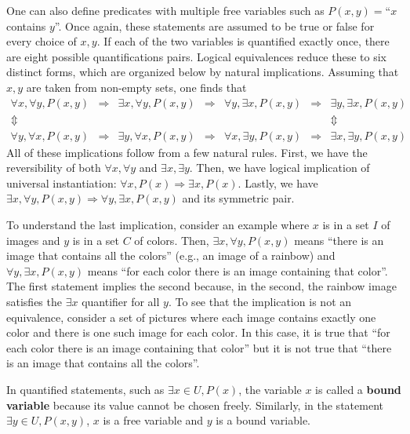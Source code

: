 One can also define predicates with multiple free variables such as $P(x,y)=$``$x$ contains $y$''.
Once again, these statements are assumed to be true or false for every choice of $x,y$.
If each of the two variables is quantified exactly once, there are eight possible quantifications pairs.
Logical equivalences reduce these to six distinct forms, which are organized below by natural implications.
Assuming that $x,y$ are taken from non-empty sets, one finds that
\[ \begin{array}{ccccccc}
  \forall x, \forall y, P(x,y) & \Rightarrow & \exists x, \forall y, P(x,y) & \Rightarrow & \forall y, \exists x, P(x,y) & \Rightarrow & \exists y, \exists x, P(x,y) \\
  \Updownarrow &&&&&& \Updownarrow \\
  \forall y, \forall x, P(x,y) & \Rightarrow & \exists y, \forall x, P(x,y) & \Rightarrow & \forall x, \exists y, P(x,y) & \Rightarrow & \exists x, \exists y, P(x,y)
  \end{array}
\]
All of these implications follow from a few natural rules.
First, we have the reversibility of both $\forall x, \forall y$ and $\exists x, \exists y$.
Then, we have logical implication of universal instantiation: $\forall x, P(x) \Rightarrow \exists x, P(x)$.
Lastly, we have $\exists x, \forall y, P(x,y) \Rightarrow \forall y, \exists x, P(x,y)$ and its symmetric pair.

To understand the last implication, consider an example where $x$ is in a set $I$ of images and $y$ is in a set $C$ of colors.
Then, $\exists x, \forall y, P(x,y)$ means ``there is an image that contains all the colors'' (e.g., an image of a rainbow) and $\forall y, \exists x, P(x,y)$ means ``for each color there is an image containing that color''.
The first statement implies the second because, in the second, the rainbow image satisfies the $\exists x$ quantifier for all $y$.
To see that the implication is not an equivalence, consider a set of pictures where each image contains exactly one color and there is one such image for each color.
In this case, it is true that ``for each color there is an image containing that color'' but it is not true that ``there is an image that contains all the colors''.

In quantified statements, such as $\exists x\in U, P(x)$, the variable $x$ is called a \textbf{bound variable} because its value cannot be chosen freely.
Similarly, in the statement $\exists y \in U, P(x,y)$, $x$ is a free variable and $y$ is a bound variable.

